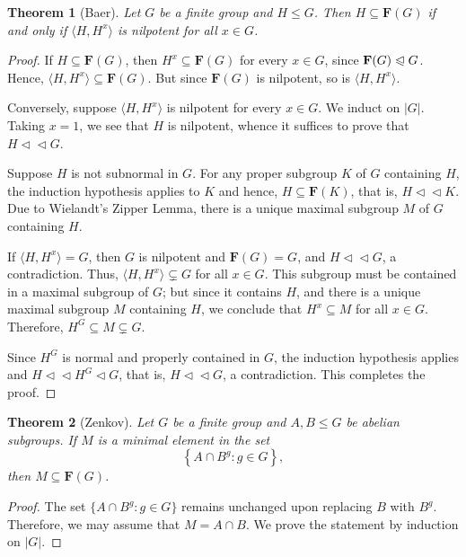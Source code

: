 \documentclass[12pt]{article}
\theoremstyle{thmstyle}
\newtheorem{theorem}{Theorem}[section]
\theoremstyle{defstyle}
\renewcommand{\le}{\leqslant}
\newcommand{\bfF}{\mathbf{F}} %
\newcommand{\nor}{\vartriangleleft}
\newcommand{\noreq}{\trianglelefteqslant}
\newcommand{\subnor}{\nor\!\nor}
\begin{document}
\begin{theorem}[Baer]
    Let $G$ be a finite group and $H\le G$. Then $H\subseteq\bfF(G)$ if and only if $\langle H, H^x\rangle$ is nilpotent for all $x\in G$.
\end{theorem}
\begin{proof}
    If $H\subseteq\bfF(G)$, then $H^x\subseteq\bfF(G)$ for every $x\in G$, since $\bfF(G)\noreq G$. Hence, $\langle H, H^x\rangle\subseteq\bfF(G)$. But since $\bfF(G)$ is nilpotent, so is $\langle H, H^x\rangle$.

    Conversely, suppose $\langle H, H^x\rangle$ is nilpotent for every $x\in G$. We induct on $|G|$. Taking $x = 1$, we see that $H$ is nilpotent, whence it suffices to prove that $H\subnor G$. 

    Suppose $H$ is not subnormal in $G$. For any proper subgroup $K$ of $G$ containing $H$, the induction hypothesis applies to $K$ and hence, $H\subseteq\bfF(K)$, that is, $H\subnor K$. Due to Wielandt's Zipper Lemma, there is a unique maximal subgroup $M$ of $G$ containing $H$.

    If $\langle H, H^x\rangle = G$, then $G$ is nilpotent and $\bfF(G) = G$, and $H\subnor G$, a contradiction. Thus, $\langle H, H^x\rangle\subsetneq G$ for all $x\in G$. This subgroup must be contained in a maximal subgroup of $G$; but since it contains $H$, and there is a unique maximal subgroup $M$ containing $H$, we conclude that $H^x\subseteq M$ for all $x\in G$. Therefore, $H^G\subseteq M\subsetneq G$. 

    Since $H^G$ is normal and properly contained in $G$, the induction hypothesis applies and $H\subnor H^G\nor G$, that is, $H\subnor G$, a contradiction. This completes the proof.
\end{proof}

\begin{theorem}[Zenkov]
    Let $G$ be a finite group and $A, B\le G$ be abelian subgroups. If $M$ is a minimal element in the set 
    \begin{equation*}
        \left\{A\cap B^g\colon g\in G\right\},
    \end{equation*}
    then $M\subseteq\bfF(G)$.
\end{theorem}
\begin{proof}
    The set $\{A\cap B^g\colon g\in G\}$ remains unchanged upon replacing $B$ with $B^g$. Therefore, we may assume that $M = A\cap B$. We prove the statement by induction on $|G|$.
\end{proof}
\end{document}
